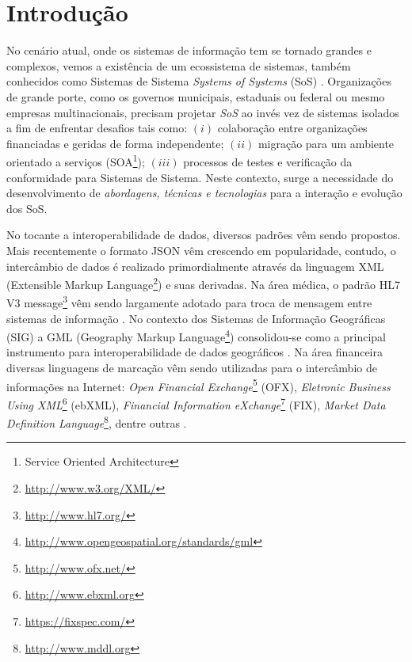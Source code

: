 \documentclass[msc,proposal,hidelot,hideabstract]{ppgccufmg} %
\begin{document}
\chapter{Introdução}
\label{ch:Contexto}
No cenário atual, onde os sistemas de informação tem se tornado grandes e
complexos, vemos a existência de um ecossistema de sistemas, também conhecidos
como Sistemas de Sistema \textit{Systems of Systems} (SoS)
\cite{Nakagawa:2013:SAF:2489850.2489853}. Organizações de grande porte, como os
governos municipais, estaduais ou federal ou mesmo empresas multinacionais,
precisam projetar \textit{SoS} ao invés vez de sistemas isolados a fim de enfrentar desafios tais como: $(i)$ colaboração entre organizações financiadas e geridas de forma independente; $(ii)$ migração para um ambiente orientado a serviços (SOA\footnote{Service Oriented Architecture }); $(iii)$ processos de testes e verificação da conformidade para Sistemas de Sistema. Neste contexto, surge a necessidade do desenvolvimento de \textit{abordagens, técnicas e tecnologias} para a interação e evolução dos SoS.

No tocante a interoperabilidade de dados, diversos padrões vêm sendo
propostos. Mais recentemente o formato JSON \cite{RFC4627} vêm crescendo em
popularidade, contudo, o intercâmbio de dados é realizado primordialmente
através da linguagem XML (Extensible Markup
Language\footnote{\url{http://www.w3.org/XML/}}) e suas derivadas. Na área
médica, o padrão HL7 V3 message\footnote{\url{http://www.hl7.org/}} vêm sendo
largamente adotado para troca de mensagem entre sistemas de informação
\cite{Andrikopoulos:2013:TEO:2491845.2491890}{}. No contexto dos Sistemas de
Informação Geográficas (SIG) a GML (Geography Markup
Language\footnote{\url{http://www.opengeospatial.org/standards/gml}})
consolidou-se como a principal instrumento para interoperabilidade de dados geográficos \cite{gmlpaper}{}. Na área financeira diversas linguagens de marcação vêm sendo utilizadas para o intercâmbio de informações na Internet: \textit{Open Financial Exchange}\footnote{\url{http://www.ofx.net/}} (OFX), \textit{Eletronic Business Using XML}\footnote{\url{http://www.ebxml.org}} (ebXML), \textit{Financial Information eXchange}\footnote{\url{https://fixspec.com/}} (FIX), \textit{Market Data Definition Language}\footnote{\url{http://www.mddl.org}}, dentre outras \cite{xbrl_conceitos_aplicacoes}{}.
\end{document}
